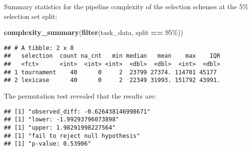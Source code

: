 \documentclass[
]{book}
\newenvironment{Shaded}{\begin{snugshade}}{\end{snugshade}}
\newcommand{\AttributeTok}[1]{\textcolor[rgb]{0.13,0.29,0.53}{#1}}
\newcommand{\DecValTok}[1]{\textcolor[rgb]{0.00,0.00,0.81}{#1}}
\newcommand{\FunctionTok}[1]{\textcolor[rgb]{0.13,0.29,0.53}{\textbf{#1}}}
\newcommand{\NormalTok}[1]{#1}
\newcommand{\OtherTok}[1]{\textcolor[rgb]{0.56,0.35,0.01}{#1}}
\newcommand{\SpecialCharTok}[1]{\textcolor[rgb]{0.81,0.36,0.00}{\textbf{#1}}}
\newcommand{\StringTok}[1]{\textcolor[rgb]{0.31,0.60,0.02}{#1}}
\begin{document}
Summary statistics for the pipeline complexity of the selection schemes at the 5\% selection set split:

\begin{Shaded}
\begin{Highlighting}[]
\FunctionTok{complexity\_summary}\NormalTok{(}\FunctionTok{filter}\NormalTok{(task\_data, split }\SpecialCharTok{==} \StringTok{\textquotesingle{}95\%\textquotesingle{}}\NormalTok{))}
\end{Highlighting}
\end{Shaded}

\begin{verbatim}
## # A tibble: 2 x 8
##   selection  count na_cnt   min median   mean    max    IQR
##   <fct>      <int>  <int> <int>  <dbl>  <dbl>  <int>  <dbl>
## 1 tournament    40      0     2  23799 27374. 114701 45177 
## 2 lexicase      40      0     2  22349 31993. 151792 43991.
\end{verbatim}

The permutation test revealed that the results are:

\begin{Shaded}
\end{Shaded}

\begin{verbatim}
## [1] "observed_diff: -0.626438146998671"
## [1] "lower: -1.99293796073898"
## [1] "upper: 1.98291998227564"
## [1] "fail to reject null hypothesis"
## [1] "p-value: 0.53906"
\end{verbatim}
\end{document}
